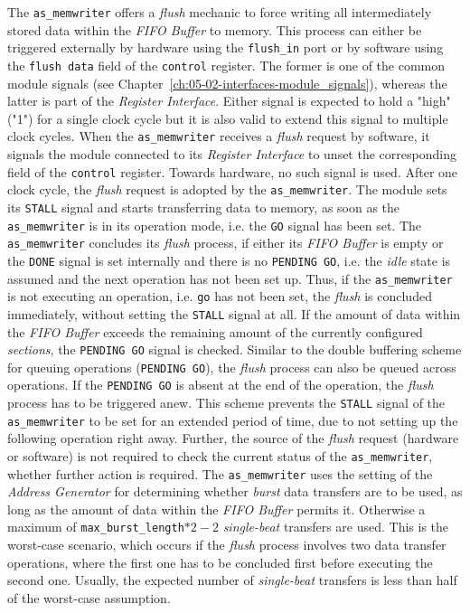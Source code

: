 The \texttt{as\_memwriter} offers a \textit{flush} mechanic to force writing all intermediately stored data within the \textit{FIFO Buffer} to memory.
This process can either be triggered externally by hardware using the \texttt{flush\_in} port or by software using the \texttt{flush data} field of the \texttt{control} register.
The former is one of the common module signals (see Chapter~\ref{ch:05-02-interfaces-module_signals}), whereas the latter is part of the \textit{Register Interface}.
Either signal is expected to hold a "high" ("1") for a single clock cycle but it is also valid to extend this signal to multiple clock cycles.
When the \texttt{as\_memwriter} receives a \textit{flush} request by software, it signals the module connected to its \textit{Register Interface} to unset the corresponding field of the \texttt{control} register.
Towards hardware, no such signal is used.
After one clock cycle, the \textit{flush} request is adopted by the \texttt{as\_memwriter}.
The module sets its \texttt{STALL} signal and starts transferring data to memory, as soon as the \texttt{as\_memwriter} is in its operation mode, i.e. the \texttt{GO} signal has been set.
The \texttt{as\_memwriter} concludes its \textit{flush} process, if either its \textit{FIFO Buffer} is empty or the \texttt{DONE} signal is set internally and there is no \texttt{PENDING GO}, i.e. the \textit{idle} state is assumed and the next operation has not been set up.
Thus, if the \texttt{as\_memwriter} is not executing an operation, i.e. \texttt{go} has not been set, the \textit{flush} is concluded immediately, without setting the \texttt{STALL} signal at all.
If the amount of data within the \textit{FIFO Buffer} exceeds the remaining amount of the currently configured \textit{sections}, the \texttt{PENDING GO} signal is checked.
Similar to the double buffering scheme for queuing operations (\texttt{PENDING GO}), the \textit{flush} process can also be queued across operations.
If the \texttt{PENDING GO} is absent at the end of the operation, the \textit{flush} process has to be triggered anew.
This scheme prevents the \texttt{STALL} signal of the \texttt{as\_memwriter} to be set for an extended period of time, due to not setting up the following operation right away.
Further, the source of the \textit{flush} request (hardware or software) is not required to check the current status of the \texttt{as\_memwriter}, whether further action is required.
The \texttt{as\_memwriter} uses the setting of the \textit{Address Generator} for determining whether \textit{burst} data transfers are to be used, as long as the amount of data within the \textit{FIFO Buffer} permits it.
Otherwise a maximum of \texttt{max\_burst\_length}$*2-2$ \textit{single-beat} transfers are used.
This is the worst-case scenario, which occurs if the \textit{flush} process involves two data transfer operations, where the first one has to be concluded first before executing the second one.
Usually, the expected number of \textit{single-beat} transfers is less than half of the worst-case assumption.


